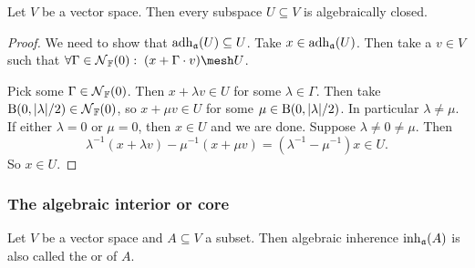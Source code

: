 \begin{lemma}
Let $V$ be a vector space. Then every subspace $U\subseteq V$ is algebraically closed.
\end{lemma}
\begin{proof}
We need to show that $\operatorname{adh}_\mathfrak{a}(U)\subseteq U$. Take $x\in \operatorname{adh}_\mathfrak{a}(U)$. Then take a $v\in V$ such that $\forall \Gamma\in\neighbourhood_\F(0):\; (x+\Gamma\cdot v)\mesh U$.

Pick some $\Gamma\in\operatorname{\mathcal{N}}_{\mathbb{F}}(0)$. Then $x+\lambda v\in U$ for some $\lambda\in \Gamma$. Then take $\operatorname{B}(0,|\lambda|/2)\in \operatorname{\mathcal{N}}_{\mathbb{F}}(0)$, so $x+\mu v\in U$ for some $\mu\in \operatorname{B}(0,|\lambda|/2)$. In particular $\lambda \neq \mu$. If either $\lambda =0$ or $\mu = 0$, then $x\in U$ and we are done. Suppose $\lambda\neq 0 \neq \mu$. Then
\[ \lambda^{-1}(x+\lambda v) - \mu^{-1}(x+\mu v) = (\lambda^{-1} - \mu^{-1})x \in U. \]
So $x\in U$.
\end{proof}

\subsubsection{The algebraic interior or core}
\begin{definition}
Let $V$ be a vector space and $A\subseteq V$ a subset. Then algebraic inherence $\operatorname{inh}_\mathfrak{a}(A)$ is also called the  or  of $A$.
\end{definition}

